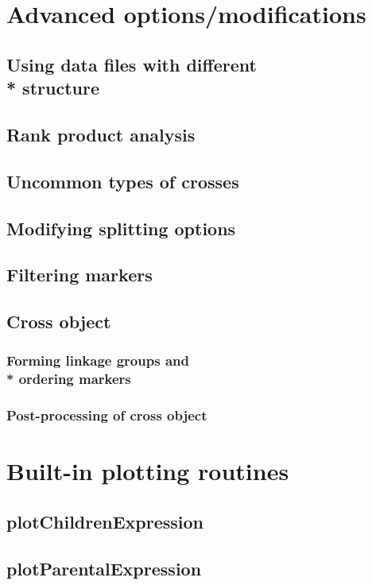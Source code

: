 \documentclass{article}
\begin{document}
\section{Advanced options/modifications}
\begin{multicols}{2}
\subsection{Using data files with different \\* structure}
\blindtext
\subsection{Rank product analysis}
\blindtext
\subsection{Uncommon types of crosses}
\blindtext
\subsection{Modifying splitting options}
\blindtext
\subsection{Filtering markers}
\blindtext
\subsection{Cross object}
\blindtext
\subsubsection{Forming linkage groups and \\* ordering markers}
\blindtext
\subsubsection{Post-processing of cross object}
\blindtext
\end{multicols}
\newpage
\section{Built-in plotting routines}
\subsection{plotChildrenExpression}
\blindtext[2]
\subsection{plotParentalExpression}
\blindtext[2]
\end{document}

